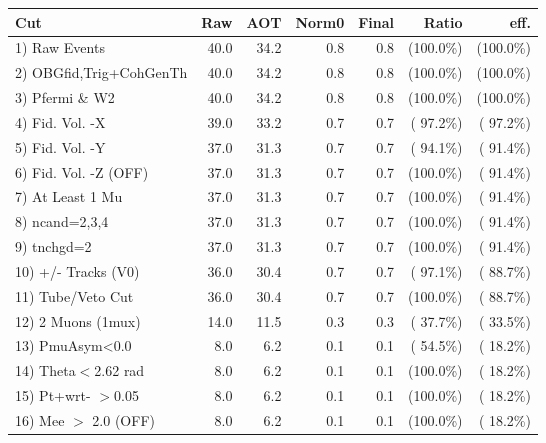  \begin{table}[h!]\centering
 \begin{tabular}{||l||r|r|r|r|r|r||}
 \hline
 \hline
 Cut & Raw & AOT & Norm0 & Final & Ratio & eff.       \\
 \hline
  1) Raw Events           &         40.0 &         34.2 &          0.8 &          0.8 & (100.0\%) & (100.0\%) \\
  2) OBGfid,Trig+CohGenTh &         40.0 &         34.2 &          0.8 &          0.8 & (100.0\%) & (100.0\%) \\
  3) Pfermi \& W2         &         40.0 &         34.2 &          0.8 &          0.8 & (100.0\%) & (100.0\%) \\
  4) Fid. Vol. -X         &         39.0 &         33.2 &          0.7 &          0.7 & ( 97.2\%) & ( 97.2\%) \\
  5) Fid. Vol. -Y         &         37.0 &         31.3 &          0.7 &          0.7 & ( 94.1\%) & ( 91.4\%) \\
  6) Fid. Vol. -Z (OFF)   &         37.0 &         31.3 &          0.7 &          0.7 & (100.0\%) & ( 91.4\%) \\
  7) At Least 1 Mu        &         37.0 &         31.3 &          0.7 &          0.7 & (100.0\%) & ( 91.4\%) \\
  8) ncand=2,3,4          &         37.0 &         31.3 &          0.7 &          0.7 & (100.0\%) & ( 91.4\%) \\
  9) tnchgd=2             &         37.0 &         31.3 &          0.7 &          0.7 & (100.0\%) & ( 91.4\%) \\
 10) +/- Tracks (V0)      &         36.0 &         30.4 &          0.7 &          0.7 & ( 97.1\%) & ( 88.7\%) \\
 11) Tube/Veto Cut        &         36.0 &         30.4 &          0.7 &          0.7 & (100.0\%) & ( 88.7\%) \\
 12) 2 Muons (1mux)       &         14.0 &         11.5 &          0.3 &          0.3 & ( 37.7\%) & ( 33.5\%) \\
 13) PmuAsym<0.0          &          8.0 &          6.2 &          0.1 &          0.1 & ( 54.5\%) & ( 18.2\%) \\
 14) Theta$<$2.62 rad     &          8.0 &          6.2 &          0.1 &          0.1 & (100.0\%) & ( 18.2\%) \\
 15) Pt+wrt- $>$0.05      &          8.0 &          6.2 &          0.1 &          0.1 & (100.0\%) & ( 18.2\%) \\
 16) Mee $>$ 2.0  (OFF)   &          8.0 &          6.2 &          0.1 &          0.1 & (100.0\%) & ( 18.2\%) \\

\end{tabular}
\end{table}
